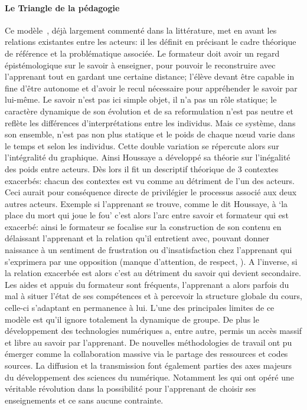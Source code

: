     \paragraph{Le Triangle de la pédagogie}    
        Ce modèle~, déjà largement commenté dans la littérature, met en avant les relations existantes entre les acteurs: il les définit en précisant le cadre théorique de référence et la problématique associée.
        Le formateur doit avoir un regard épistémologique sur le savoir à enseigner, pour pouvoir le reconstruire avec l'apprenant tout en gardant une certaine distance; l'élève devant être capable in fine d'être autonome et d'avoir le recul nécessaire pour appréhender le savoir par lui-même. Le savoir n'est pas ici simple objet, il n'a pas un rôle statique; le caractère dynamique de son évolution et de sa reformulation n'est pas neutre et reflète les différences d'interprétations entre les individus.
        Mais ce système, dans son ensemble, n'est pas non plus statique et le poids de chaque nœud varie dans le temps et selon les individus. Cette double variation se répercute alors sur l'intégralité du graphique.
        Ainsi Houssaye a développé sa théorie sur l'inégalité des poids entre acteurs. Dès lors il fit un descriptif théorique de 3 contextes exacerbés: chacun des contextes est vu comme au détriment de l'un des acteurs. Ceci aurait pour conséquence directe de privilégier le processus associé aux deux autres acteurs.
        Exemple si l'apprenant se trouve, comme le dit Houssaye, à ‘la place du mort qui joue le fou’ c'est alors l'arc entre savoir et formateur qui est exacerbé: ainsi le formateur se focalise sur la construction de son contenu en délaissant l'apprenant et la relation qu'il entretient avec, pouvant donner naissance à un sentiment de frustration ou d'insatisfaction chez l'apprenant qui s'exprimera par une opposition (\eg manque d'attention, de respect, \etc). 
        A l'inverse, si la relation exacerbée est  alors c'est au détriment du savoir qui devient secondaire. Les aides et appuis du formateur sont fréquents, l'apprenant a alors parfois du mal à situer l'état de ses compétences et à percevoir la structure globale du cours, celle-ci s'adaptant en permanence à lui.
        L'une des principales limites de ce modèle est qu'il ignore totalement la dynamique de groupe. De plus le développement des technologies numériques a, entre autre, permis un accès massif et libre au savoir par l'apprenant. De nouvelles méthodologies de travail ont pu émerger comme la collaboration massive via le partage des ressources et codes sources. La diffusion et la transmission font également parties des axes majeurs du développement des sciences du numérique. Notamment les  qui ont opéré une véritable révolution dans la possibilité pour l'apprenant de choisir ses enseignements et ce sans aucune contrainte.
